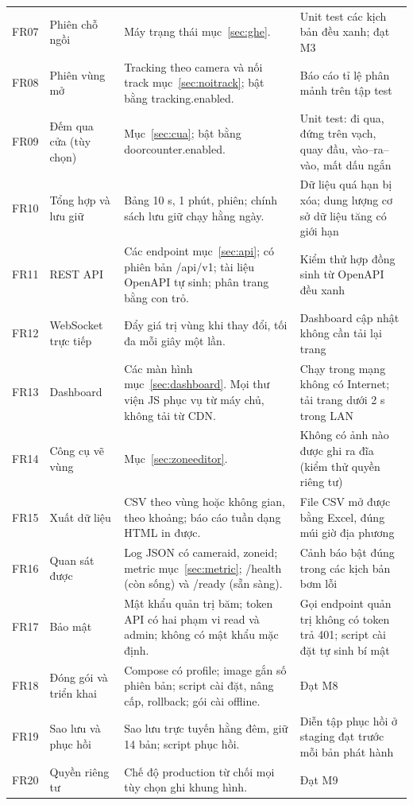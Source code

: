 \documentclass[10pt,a4paper,oneside,openany]{report}
\newcommand{\breakus}{\textunderscore\allowbreak}
\newcommand{\code}[1]{{\ttfamily\let\_\breakus #1}}
\newenvironment{bang}{\par\small\rowcolors{2}{rowgray}{white}}{\par\vspace{0.3em}}
\begin{document}
\begin{bang}
\begin{xltabular}{\linewidth}{L{10mm}L{32mm}Y L{44mm}}
FR07 & Phiên chỗ ngồi & Máy trạng thái mục~\ref{sec:ghe}. & Unit test các kịch bản đều xanh; đạt M3 \\
FR08 & Phiên vùng mở & Tracking theo camera và nối track mục~\ref{sec:noitrack}; bật bằng \code{tracking.enabled}. & Báo cáo tỉ lệ phân mảnh trên tập test \\
FR09 & Đếm qua cửa (tùy chọn) & Mục~\ref{sec:cua}; bật bằng \code{door\_counter.enabled}. & Unit test: đi qua, đứng trên vạch, quay đầu, vào--ra--vào, mất dấu ngắn \\
FR10 & Tổng hợp và lưu giữ & Bảng 10 s, 1 phút, phiên; chính sách lưu giữ chạy hằng ngày. & Dữ liệu quá hạn bị xóa; dung lượng cơ sở dữ liệu tăng có giới hạn \\
FR11 & REST API & Các endpoint mục~\ref{sec:api}; có phiên bản \code{/api/v1}; tài liệu OpenAPI tự sinh; phân trang bằng con trỏ. & Kiểm thử hợp đồng sinh từ OpenAPI đều xanh \\
FR12 & WebSocket trực tiếp & Đẩy giá trị vùng khi thay đổi, tối đa mỗi giây một lần. & Dashboard cập nhật không cần tải lại trang \\
FR13 & Dashboard & Các màn hình mục~\ref{sec:dashboard}. Mọi thư viện JS phục vụ từ máy chủ, không tải từ CDN. & Chạy trong mạng không có Internet; tải trang dưới 2 s trong LAN \\
FR14 & Công cụ vẽ vùng & Mục~\ref{sec:zoneeditor}. & Không có ảnh nào được ghi ra đĩa (kiểm thử quyền riêng tư) \\
FR15 & Xuất dữ liệu & CSV theo vùng hoặc không gian, theo khoảng; báo cáo tuần dạng HTML in được. & File CSV mở được bằng Excel, đúng múi giờ địa phương \\
FR16 & Quan sát được & Log JSON có \code{camera\_id}, \code{zone\_id}; metric mục~\ref{sec:metric}; \code{/health} (còn sống) và \code{/ready} (sẵn sàng). & Cảnh báo bật đúng trong các kịch bản bơm lỗi \\
FR17 & Bảo mật & Mật khẩu quản trị băm; token API có hai phạm vi \code{read} và \code{admin}; không có mật khẩu mặc định. & Gọi endpoint quản trị không có token trả 401; script cài đặt tự sinh bí mật \\
FR18 & Đóng gói và triển khai & Compose có profile; image gắn số phiên bản; script cài đặt, nâng cấp, rollback; gói cài offline. & Đạt M8 \\
FR19 & Sao lưu và phục hồi & Sao lưu trực tuyến hằng đêm, giữ 14 bản; script phục hồi. & Diễn tập phục hồi ở staging đạt trước mỗi bản phát hành \\
FR20 & Quyền riêng tư & Chế độ production từ chối mọi tùy chọn ghi khung hình. & Đạt M9 \\
\bottomrule
\end{xltabular}
\end{bang}
\end{document}
